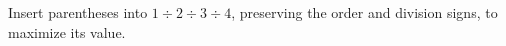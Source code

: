 Insert parentheses into $ 1\div2\div3\div4 $, preserving the order and division signs, to maximize its value.
